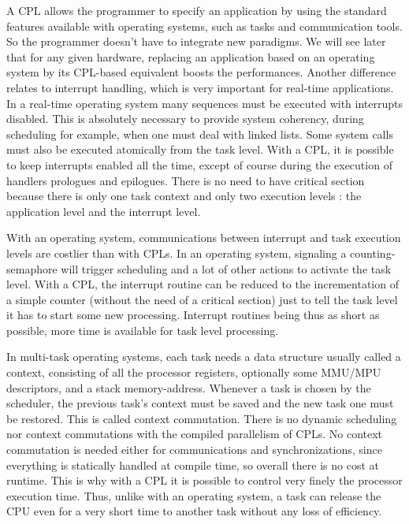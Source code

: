 \documentclass[10pt]{report}
\begin{document}
A CPL allows the programmer to specify an application by using the standard features available with operating systems, such as tasks
and communication tools. So the programmer doesn't have to integrate new paradigms. We will see later that for any given hardware, 
replacing an application based on an operating system by its CPL-based equivalent boosts the performances. Another difference
relates to interrupt handling, which is very important for real-time applications. In a real-time operating system many sequences 
must be executed with interrupts disabled. This is absolutely necessary to provide system coherency, during scheduling for example, 
when one must deal with linked lists. Some system calls must also be executed atomically from the task level. With a CPL, it is possible 
to keep interrupts enabled all the time, except of course during the execution of handlers prologues and epilogues. There is no need 
to have critical section because there is only one task context and only two execution levels : the application level 
and the interrupt level.

With an operating system, communications between interrupt and task execution levels are costlier than with CPLs. In an operating system, 
signaling a counting-semaphore will trigger scheduling and a lot of other actions to activate the task level. With a CPL, the interrupt routine 
can be reduced to the incrementation of a simple counter (without the need of a critical section) just to tell the task level it has to start 
some new processing. Interrupt routines being thus as short as possible, more time is available for task level processing.

In multi-task operating systems, each task needs a data structure usually called a context, consisting of all the processor
registers, optionally some MMU/MPU descriptors, and a stack memory-address. Whenever a task is chosen by the scheduler, the previous 
task's context must be saved and the new task one must be restored. This is called context commutation. There is no dynamic scheduling 
nor context commutations with the compiled parallelism of CPLs. No context commutation is needed either for communications and synchronizations, 
since everything is statically handled at compile time, so overall there is no cost at runtime. This is why with a CPL it is possible to control 
very finely the processor execution time. Thus, unlike with an operating system, a task can release the CPU even for a very short time to another 
task without any loss of efficiency.
\end{document}
